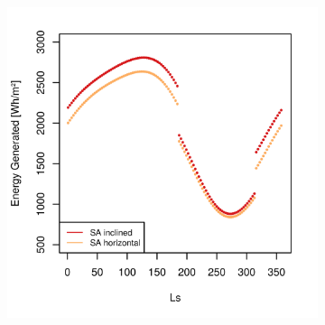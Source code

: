 \begin{figure}[h]
\captionsetup[subfigure]{justification=centering}
\vspace{-2ex}
	\centering
    \setlength{\subfigureWidth}{0.50\textwidth}
    \setlength{\graphicsHeight}{80mm}
    \hypersetup{hidelinks=true}%
    \begin{subfigure}[t]{\subfigureWidth}
        \centering
        \includegraphics[height=\graphicsHeight]{sections/design/solar-array/plots/ismeniuscavus-daily-generated-energy.png}
        \label{fig:plot:sub:ismenius-cavus-generated-energy}
    \end{subfigure}\hfill
    \begin{subfigure}[t]{\subfigureWidth}
        \centering

\end{subfigure}
\end{figure}
